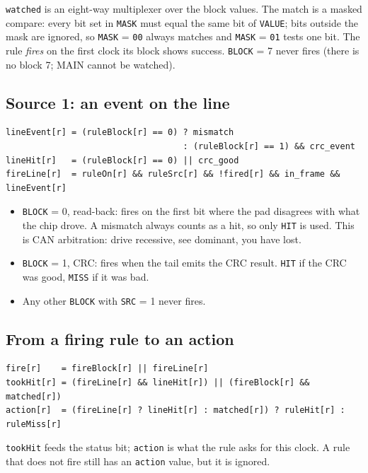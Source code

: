 \documentclass[11pt,a4paper]{article}
\newcommand{\sig}[1]{\texttt{#1}}
\begin{document}
\sig{watched} is an eight-way multiplexer over the block values. The match is a masked compare: every bit set in \sig{MASK} must equal the same bit of \sig{VALUE}; bits outside the mask are ignored, so \sig{MASK} = \texttt{00} always matches and \sig{MASK} = \texttt{01} tests one bit. The rule \emph{fires} on the first clock its block shows success. \sig{BLOCK} = 7 never fires (there is no block 7; MAIN cannot be watched).

\subsection{Source 1: an event on the line}

\begin{lstlisting}
lineEvent[r] = (ruleBlock[r] == 0) ? mismatch
                                   : (ruleBlock[r] == 1) && crc_event
lineHit[r]   = (ruleBlock[r] == 0) || crc_good
fireLine[r]  = ruleOn[r] && ruleSrc[r] && !fired[r] && in_frame && lineEvent[r]
\end{lstlisting}

\begin{itemize}
\item \sig{BLOCK} = 0, read-back: fires on the first bit where the pad disagrees with what the chip drove. A mismatch always counts as a hit, so only \sig{HIT} is used. This is CAN arbitration: drive recessive, see dominant, you have lost.
\item \sig{BLOCK} = 1, CRC: fires when the tail emits the CRC result. \sig{HIT} if the CRC was good, \sig{MISS} if it was bad.
\item Any other \sig{BLOCK} with \sig{SRC} = 1 never fires.
\end{itemize}

\subsection{From a firing rule to an action}

\begin{lstlisting}
fire[r]    = fireBlock[r] || fireLine[r]
tookHit[r] = (fireLine[r] && lineHit[r]) || (fireBlock[r] && matched[r])
action[r]  = (fireLine[r] ? lineHit[r] : matched[r]) ? ruleHit[r] : ruleMiss[r]
\end{lstlisting}

\sig{tookHit} feeds the status bit; \sig{action} is what the rule asks for this clock. A rule that does not fire still has an \sig{action} value, but it is ignored.
\end{document}
